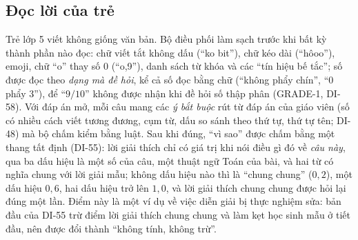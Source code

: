 \subsection{Đọc lời của trẻ}
Trẻ lớp 5 viết không giống văn bản. Bộ điều phối làm sạch trước khi bất kỳ thành phần nào đọc: chữ viết tắt không dấu (``ko bit''), chữ kéo dài (``hôoo''), emoji, chữ ``o'' thay số 0 (``o,9''), danh sách từ khóa và các ``tín hiệu bế tắc''; số được đọc theo \emph{dạng mà đề hỏi}, kể cả số đọc bằng chữ (``không phẩy chín'', ``0 phẩy 3''), để ``$9/10$'' không được nhận khi đề hỏi số thập phân (GRADE-1, DI-58). Với đáp án mở, mỗi câu mang các \emph{ý bắt buộc} rút từ đáp án của giáo viên (số có nhiều cách viết tương đương, cụm từ, dấu so sánh theo thứ tự, thứ tự tên; DI-48) mà bộ chấm kiểm bằng luật. Sau khi đúng, ``vì sao'' được chấm bằng một thang tất định (DI-55): lời giải thích chỉ có giá trị khi nói điều gì đó về \emph{câu này}, qua ba dấu hiệu là một số của câu, một thuật ngữ Toán của bài, và hai từ có nghĩa chung với lời giải mẫu; không dấu hiệu nào thì là ``chung chung'' ($0{,}2$), một dấu hiệu $0{,}6$, hai dấu hiệu trở lên $1{,}0$, và lời giải thích chung chung được hỏi lại đúng một lần. Điểm này là một ví dụ về việc diễn giải bị thực nghiệm sửa: bản đầu của DI-55 trừ điểm lời giải thích chung chung và làm kẹt học sinh mẫu ở tiết đầu, nên được đổi thành ``không tính, không trừ''.
